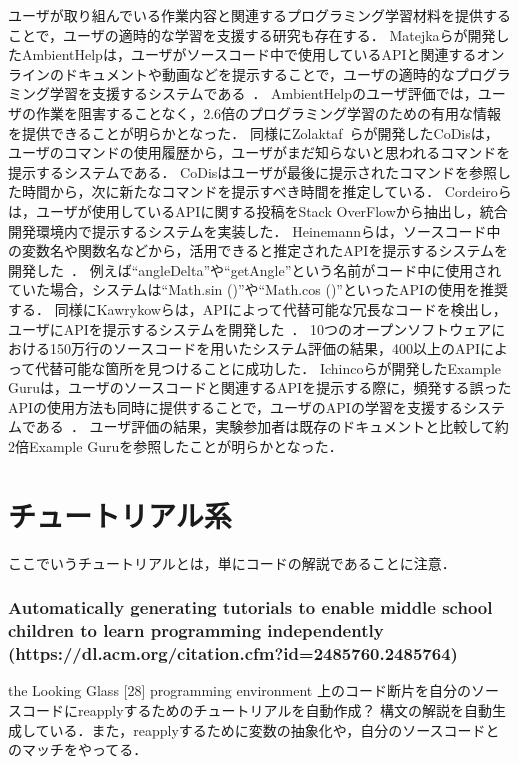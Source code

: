 ユーザが取り組んでいる作業内容と関連するプログラミング学習材料を提供することで，ユーザの適時的な学習を支援する研究も存在する．
Matejkaらが開発したAmbientHelpは，ユーザがソースコード中で使用しているAPIと関連するオンラインのドキュメントや動画などを提示することで，ユーザの適時的なプログラミング学習を支援するシステムである~\cite{Matejka_Ambient_Help}．
AmbientHelpのユーザ評価では，ユーザの作業を阻害することなく，2.6倍のプログラミング学習のための有用な情報を提供できることが明らかとなった．
同様にZolaktaf~\cite{Zolaktaf_Recommending_Commands}らが開発したCoDisは，ユーザのコマンドの使用履歴から，ユーザがまだ知らないと思われるコマンドを提示するシステムである．
CoDisはユーザが最後に提示されたコマンドを参照した時間から，次に新たなコマンドを提示すべき時間を推定している．
Cordeiroらは，ユーザが使用しているAPIに関する投稿をStack OverFlowから抽出し，統合開発環境内で提示するシステムを実装した\cite{Cordeiro_2012_extract_QA_SO}．
Heinemannらは，ソースコード中の変数名や関数名などから，活用できると推定されたAPIを提示するシステムを開発した~\cite{Heinemann_Identifier_Based_API_Recommendation}．
例えば``angleDelta''や``getAngle''という名前がコード中に使用されていた場合，システムは``Math.sin ()''や``Math.cos ()''といったAPIの使用を推奨する．
同様にKawrykowらは，APIによって代替可能な冗長なコードを検出し，ユーザにAPIを提示するシステムを開発した~\cite{Kawrykow_Improving_API_Usage}．
10つのオープンソフトウェアにおける150万行のソースコードを用いたシステム評価の結果，400以上のAPIによって代替可能な箇所を見つけることに成功した．
Ichincoらが開発したExample Guruは，ユーザのソースコードと関連するAPIを提示する際に，頻発する誤ったAPIの使用方法も同時に提供することで，ユーザのAPIの学習を支援するシステムである~\cite{Ichinco_Suggesting_API_Usage}．
ユーザ評価の結果，実験参加者は既存のドキュメントと比較して約2倍Example Guruを参照したことが明らかとなった．


\section{チュートリアル系}

ここでいうチュートリアルとは，単にコードの解説であることに注意．

\subsubsection*{Automatically generating tutorials to enable middle school children to learn programming independently (https://dl.acm.org/citation.cfm?id=2485760.2485764)}

the Looking Glass [28] programming environment 上のコード断片を自分のソースコードにreapplyするためのチュートリアルを自動作成？
構文の解説を自動生成している．また，reapplyするために変数の抽象化や，自分のソースコードとのマッチをやってる．

